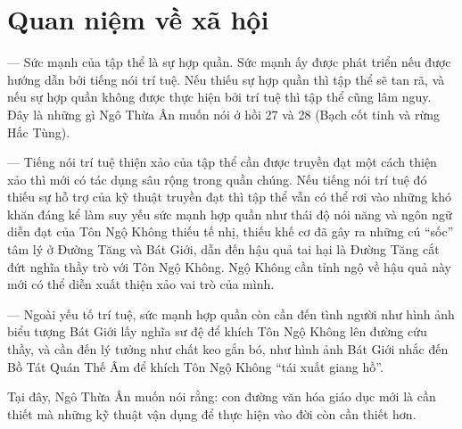 \section{Quan niệm về xã hội} %
\label{sec:27_28_xa_hoi}

--- Sức mạnh của tập thể là sự hợp quần. Sức mạnh ấy được phát triển nếu được hướng dẫn bởi tiếng nói trí tuệ. Nếu thiếu sự hợp quần thì tập thể sẽ tan rã, và nếu sự hợp quần không được thực hiện bởi trí tuệ thì tập thể cũng lâm nguy. Đây là những gì Ngô Thừa Ân muốn nói ở hồi 27 và 28 (Bạch cốt tinh và rừng Hắc Tùng).

--- Tiếng nói trí tuệ thiện xảo của tập thể cần được truyền đạt một cách thiện xảo thì mới có tác dụng sâu rộng trong quần chúng. Nếu tiếng nói trí tuệ đó thiếu sự hỗ trợ của kỹ thuật truyền đạt thì tập thể vẫn có thể rơi vào những khó khăn đáng kể làm suy yếu sức mạnh hợp quần như thái độ nói năng và ngôn ngữ diễn đạt của Tôn Ngộ Không thiếu tế nhị, thiếu khế cơ đã gây ra những cú ``sốc'' tâm lý ở Đường Tăng và Bát Giới, dẫn đến hậu quả tai hại là Đường Tăng cắt đứt nghĩa thầy trò với Tôn Ngộ Không. Ngộ Không cần tỉnh ngộ về hậu quả này mới có thể diễn xuất thiện xảo vai trò của mình.

--- Ngoài yếu tố trí tuệ, sức mạnh hợp quần còn cần đến tình người như hình ảnh biểu tượng Bát Giới lấy nghĩa sư đệ để khích Tôn Ngộ Không lên đường cứu thầy, và cần đến lý tưởng như chất keo gắn bó, như hình ảnh Bát Giới nhắc đến Bồ Tát Quán Thế Âm để khích Tôn Ngộ Không ``tái xuất giang hồ''.

Tại đây, Ngô Thừa Ân muốn nói rằng: con đường văn hóa giáo dục mới là cần thiết mà những kỹ thuật vận dụng để thực hiện vào đời còn cần thiết hơn.
